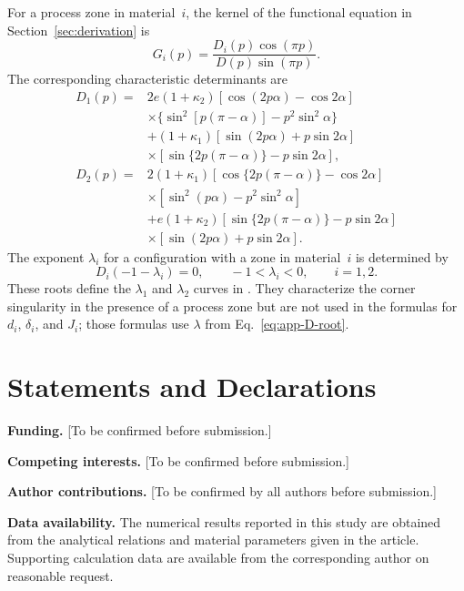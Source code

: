 \documentclass[pdflatex,iicol,sn-mathphys-ay]{sn-jnl}
\begin{document}
\begin{appendices}
For a process zone in material~$i$, the kernel of the functional equation
in Section~\ref{sec:derivation} is
\begin{equation*}
  G_i(p)=\frac{D_i(p)\cos(\pi p)}{D(p)\sin(\pi p)}.
\end{equation*}
The corresponding characteristic determinants are
{\small
\begin{equation}
\label{eq:app-post-zone-determinants}
\begin{aligned}
  D_1(p)={}&2e(1+\kappa_2)
  [\cos(2p\alpha)-\cos2\alpha]\\
  &\times\{\sin^2[p(\pi-\alpha)]-p^2\sin^2\alpha\}\\
  &+(1+\kappa_1)
  [\sin(2p\alpha)+p\sin2\alpha]\\
  &\times[\sin\{2p(\pi-\alpha)\}-p\sin2\alpha],\\[3pt]
  D_2(p)={}&2(1+\kappa_1)
  [\cos\{2p(\pi-\alpha)\}-\cos2\alpha]\\
  &\times[\sin^2(p\alpha)-p^2\sin^2\alpha]\\
  &+e(1+\kappa_2)
  [\sin\{2p(\pi-\alpha)\}-p\sin2\alpha]\\
  &\times[\sin(2p\alpha)+p\sin2\alpha].
\end{aligned}
\end{equation}
}
The exponent $\lambda_i$ for a configuration with a zone in
material~$i$ is determined by
\begin{equation}
\label{eq:app-post-zone-root}
  D_i(-1-\lambda_i)=0,
  \qquad -1<\lambda_i<0,
  \qquad i=1,2.
\end{equation}
These roots define the $\lambda_1$ and $\lambda_2$ curves in
\SingularityExponentFigure. They characterize the corner singularity in the
presence of a process zone but are not used in the formulas for $d_i$,
$\delta_i$, and $J_i$; those formulas use $\lambda$ from
Eq.~\eqref{eq:app-D-root}.

\end{appendices}

\section*{Statements and Declarations}
\textbf{Funding.} [To be confirmed before submission.]

\textbf{Competing interests.} [To be confirmed before submission.]

\textbf{Author contributions.} [To be confirmed by all authors before submission.]

\textbf{Data availability.} The numerical results reported in this study are obtained from the analytical relations and material parameters given in the article. Supporting calculation data are available from the corresponding author on reasonable request.


\end{document}
